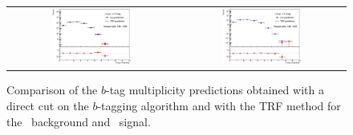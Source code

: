 \begin{figure}[!t]
\begin{center}
\begin{tabular}{cc} 
\includegraphics[width=0.49\textwidth]{Modeling/Figures/plots_trf/tt_4jetin_0btagin_bjet_n_logscale} &
\includegraphics[width=0.49\textwidth]{Modeling/Figures/plots_trf/ttH125_4jetin_0btagin_bjet_n_logscale} \\  
\end{tabular}
\end{center}
\caption{
Comparison of the $b$-tag multiplicity predictions obtained with a direct cut on the $b$-tagging algorithm and with the TRF method for the \ttbar\ background and \ttH\ signal. }
\label{fig:TRFclos_jetn}
\end{figure}

